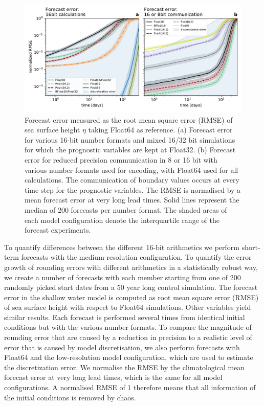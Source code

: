 \documentclass[draft]{agujournal2019}
\begin{document}
\begin{figure}
\includegraphics[width=1\textwidth]{rmse_eta_darker.pdf}
\caption{Forecast error measured as the root mean square error (RMSE) of sea surface height $\eta$ taking Float64 as reference. (a) Forecast error for various 16-bit number formats and mixed 16/32 bit simulations for which the prognostic variables are kept at Float32. (b) Forecast error for reduced precision communication in 8 or 16 bit with various number formats used for encoding, with Float64 used for all calculations.  The communication of boundary values occurs at every time step for the prognostic variables. The RMSE is normalised by a mean forecast error at very long lead times. Solid lines represent the median of 200 forecasts per number format. The shaded areas of each model configuration denote the interquartile range of the forecast experiments.}
\label{fig:rmse}
\end{figure}

To quantify differences between the different 16-bit arithmetics we perform short-term forecasts with the medium-resolution configuration. To quantify the error growth of rounding errors with different arithmetics in a statistically robust way, we create a number of forecasts with each member starting from one of 200 randomly picked start dates from a 50 year long control simulation. The forecast error in the shallow water model is computed as root mean square error (RMSE) of sea surface height with respect to Float64 simulations. Other variables yield similar results. Each forecast is performed several times from identical initial conditions but with the various number formats. To compare the magnitude of rounding error that are caused by a reduction in precision to a realistic level of error that is caused by model discretisation, we also perform forecasts with Float64 and the low-resolution model configuration, which are used to estimate the discretization error. We normalise the RMSE by the climatological mean forecast error at very long lead times, which is the same for all model configurations. A normalised RMSE of 1 therefore means that all information of the initial conditions is removed by chaos.
\end{document}
